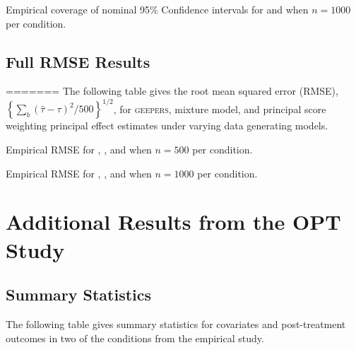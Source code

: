 \documentclass[]{article}
\begin{document}
 \begin{table}
  \caption{Empirical coverage of nominal 95\% Confidence intervals for \geepers and \pmm when $n=1000$ per condition.}
  
 \end{table}


 

\FloatBarrier
\subsection{Full RMSE Results}
\FloatBarrier

=======
The following table gives the root mean squared error (RMSE), $\left\{\sum_b (\hat{\tau}-\tau)^2/500\right\}^{1/2}$, for \textsc{geepers}, mixture model, and principal score weighting principal effect estimates under varying data generating models.\\

\begin{table}
  \caption{Empirical RMSE  for \geepers, \pmm, and \psw when $n=500$ per condition.}
  
 \end{table}


 \begin{table}
  \caption{Empirical RMSE  for \geepers, \pmm, and \psw when $n=1000$ per condition.}
  
 \end{table}



\FloatBarrier
\section{Additional Results from the OPT Study}
\FloatBarrier
\singlespacing
\FloatBarrier
\subsection{Summary Statistics}
\FloatBarrier

The following table gives summary statistics for covariates and post-treatment outcomes in two of the conditions from the empirical study.\\
\end{document}
